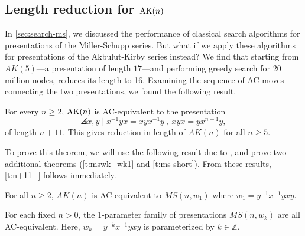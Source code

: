

\subsection{Length reduction for $\text{AK}(n)$}
\label{sec:len-reduction}

In \autoref{sec:search-ms}, we discussed the performance of classical search algorithms for presentations of the Miller-Schupp series. But what if we apply these algorithms for presentations of the Akbulut-Kirby series instead? We find that starting from $AK(5)$---a presentation of length $17$---and performing greedy search for $20$ million nodes, reduces its length to 16. Examining the sequence of AC moves connecting the two presentations, we found the following result.

\begin{theorem}\label{t:n+11_}
	For every $n\geq 2$, $\text{AK}(n)$ is AC-equivalent to the presentation
	\[
	\angles{ x,y \mid x^{-1} y x = x y x^{-1} y \ ,\  xyx=yx^{n-1}y },
	\]
	of length $n+11$. This gives reduction in length of $AK(n)$ for all $n \geq 5$.
\end{theorem}

To prove this theorem, we will  use the following result due to \cite{MMS}, and prove two additional theorems (\autoref{t:mswk_wk1} and \autoref{t:ms-short}). From these results, \autoref{t:n+11_} follows immediately. 

\begin{proposition}
    \label{t:MS-AK-MS}
    For all $n \geq 2$, $AK(n)$ is AC-equivalent to $MS(n, w_1)$ where $w_1 = y^{-1} x^{-1} y x y$.
\end{proposition}

\begin{theorem}\label{t:mswk_wk1}
    For each fixed $n > 0$, the 1-parameter family of presentations $MS(n, w_k)$ are all AC-equivalent. Here, $w_k = y^{-k} x^{-1} y x y$ is parameterized by $k \in \mathbb{Z}$. 
\end{theorem}


